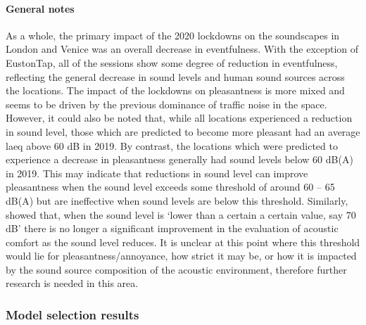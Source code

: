    \paragraph*{General notes} As a whole, the primary impact of the 2020 lockdowns on the soundscapes in London and Venice was an overall decrease in eventfulness. With the exception of EustonTap, all of the sessions show some degree of reduction in eventfulness, reflecting the general decrease in sound levels and human sound sources across the locations. The impact of the lockdowns on pleasantness is more mixed and seems to be driven by the previous dominance of traffic noise in the space. However, it could also be noted that, while all locations experienced a reduction in sound level, those which are predicted to become more pleasant had an average \gls{laeq} above 60 dB in 2019. By contrast, the locations which were predicted to experience a decrease in pleasantness generally had sound levels below 60 dB(A) in 2019. This may indicate that reductions in sound level can improve pleasantness when the sound level exceeds some threshold of around 60 -- 65 dB(A) but are ineffective when sound levels are below this threshold. Similarly, \citet{Yang2005Acoustic} showed that, when the sound level is `lower than a certain a certain value, say 70 dB' there is no longer a significant improvement in the evaluation of acoustic comfort as the sound level reduces. It is unclear at this point where this threshold would lie for pleasantness/annoyance, how strict it may be, or how it is impacted by the sound source composition of the acoustic environment, therefore further research is needed in this area.

   \subsubsection{Model selection results}

